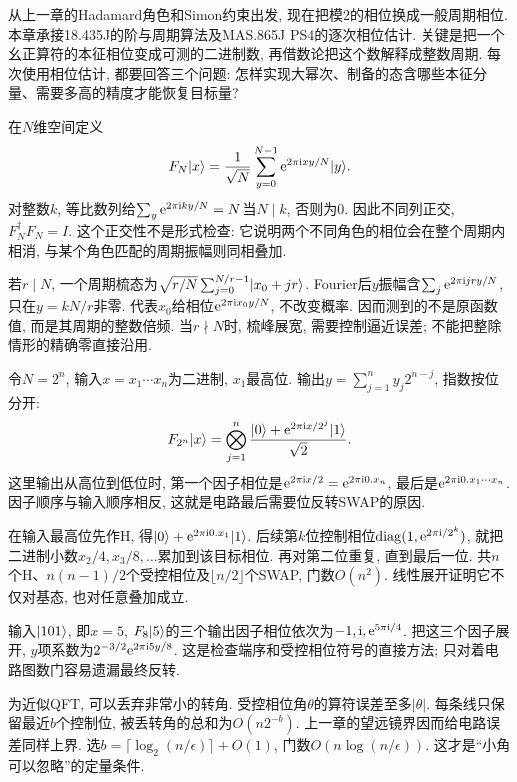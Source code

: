 从上一章的Hadamard角色和Simon约束出发, 现在把模2的相位换成一般周期相位. 本章承接18.435J的阶与周期算法及MAS.865J PS4的逐次相位估计. 关键是把一个幺正算符的本征相位变成可测的二进制数, 再借数论把这个数解释成整数周期. 每次使用相位估计, 都要回答三个问题: 怎样实现大幂次、制备的态含哪些本征分量、需要多高的精度才能恢复目标量?

在$N$维空间定义
\[F_N\lvert x\rangle=\frac1{\sqrt N}\sum_{y=0}^{N-1}\mathrm e^{2\pi\mathrm i xy/N}\lvert y\rangle.\]
对整数$k$, 等比数列给$\sum_y\mathrm e^{2\pi\mathrm i ky/N}=N$当$N\mid k$, 否则为0. 因此不同列正交, $F_N^\dagger F_N=I$. 这个正交性不是形式检查: 它说明两个不同角色的相位会在整个周期内相消, 与某个角色匹配的周期振幅则同相叠加.

若$r\mid N$, 一个周期梳态为$\sqrt{r/N}\sum_{j=0}^{N/r-1}\lvert x_0+jr\rangle$. Fourier后$y$振幅含$\sum_j\mathrm e^{2\pi\mathrm i jry/N}$, 只在$y=kN/r$非零. 代表$x_0$给相位$\mathrm e^{2\pi\mathrm i x_0y/N}$, 不改变概率. 因而测到的不是原函数值, 而是其周期的整数倍频. 当$r\nmid N$时, 梳峰展宽, 需要控制逼近误差; 不能把整除情形的精确零直接沿用.

令$N=2^n$, 输入$x=x_1\cdots x_n$为二进制, $x_1$最高位. 输出$y=\sum_{j=1}^ny_j2^{n-j}$, 指数按位分开:
\[F_{2^n}\lvert x\rangle=\bigotimes_{j=1}^n\frac{\lvert 0\rangle+\mathrm e^{2\pi\mathrm i x/2^j}\lvert 1\rangle}{\sqrt2}.\]
这里输出从高位到低位时, 第一个因子相位是$\mathrm e^{2\pi\mathrm i x/2}=\mathrm e^{2\pi\mathrm i0.x_n}$, 最后是$\mathrm e^{2\pi\mathrm i0.x_1\cdots x_n}$. 因子顺序与输入顺序相反, 这就是电路最后需要位反转SWAP的原因.

在输入最高位先作H, 得$\lvert 0\rangle+\mathrm e^{2\pi\mathrm i0.x_1}\lvert 1\rangle$. 后续第$k$位控制相位$\operatorname{diag}(1,\mathrm e^{2\pi\mathrm i/2^k})$, 就把二进制小数$x_2/4,x_3/8,\ldots$累加到该目标相位. 再对第二位重复, 直到最后一位. 共$n$个H、$n(n-1)/2$个受控相位及$\lfloor n/2\rfloor$个SWAP, 门数$O(n^2)$. 线性展开证明它不仅对基态, 也对任意叠加成立.

\begin{example}输入$\lvert 101\rangle$, 即$x=5$, $F_8\lvert 5\rangle$的三个输出因子相位依次为$-1,\mathrm i,\mathrm e^{5\pi\mathrm i/4}$. 把这三个因子展开, $y$项系数为$2^{-3/2}\mathrm e^{2\pi\mathrm i5y/8}$. 这是检查端序和受控相位符号的直接方法; 只对着电路图数门容易遗漏最终反转.\end{example}

为近似QFT, 可以丢弃非常小的转角. 受控相位角$\theta$的算符误差至多$|\theta|$. 每条线只保留最近$b$个控制位, 被丢转角的总和为$O(n2^{-b})$. 上一章的望远镜界因而给电路误差同样上界. 选$b=\lceil\log_2(n/\epsilon)\rceil+O(1)$, 门数$O(n\log(n/\epsilon))$. 这才是“小角可以忽略”的定量条件.

